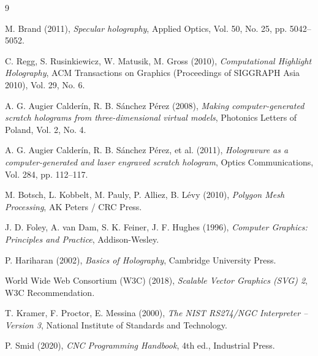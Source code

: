 \documentclass[a4paper,11pt,titlepage,twoside]{book}
\newcommand{\1}{\mathbf{1}}
\numberwithin{equation}{chapter}
\theoremstyle{plain}
\theoremstyle{definition}
\begin{document}
	\clearpage
	\renewcommand{\bibname}{Bibliografia}
	\begin{thebibliography}{9}
		
		M. Brand (2011),
		\emph{Specular holography},
		Applied Optics, Vol. 50, No. 25, pp. 5042--5052.
		
		C. Regg, S. Rusinkiewicz, W. Matusik, M. Gross (2010),
		\emph{Computational Highlight Holography},
		ACM Transactions on Graphics (Proceedings of SIGGRAPH Asia 2010), Vol. 29, No. 6.
		
		A. G. Augier Calderín, R. B. Sánchez Pérez (2008),
		\emph{Making computer-generated scratch holograms from three-dimensional virtual models},
		Photonics Letters of Poland, Vol. 2, No. 4.
		
		A. G. Augier Calderín, R. B. Sánchez Pérez, et al. (2011),
		\emph{Hologravure as a computer-generated and laser engraved scratch hologram},
		Optics Communications, Vol. 284, pp. 112--117.
		
		M. Botsch, L. Kobbelt, M. Pauly, P. Alliez, B. Lévy (2010),
		\emph{Polygon Mesh Processing},
		AK Peters / CRC Press.
		
		J. D. Foley, A. van Dam, S. K. Feiner, J. F. Hughes (1996),
		\emph{Computer Graphics: Principles and Practice},
		Addison-Wesley.
		
		P. Hariharan (2002), \emph{Basics of Holography}, Cambridge University Press.
		
		World Wide Web Consortium (W3C) (2018), \emph{Scalable Vector Graphics (SVG) 2}, W3C Recommendation.
		
		T. Kramer, F. Proctor, E. Messina (2000), \emph{The NIST RS274/NGC Interpreter -- Version 3}, National Institute of Standards and Technology.
		
		P. Smid (2020), \emph{CNC Programming Handbook}, 4th ed., Industrial Press.
	\end{thebibliography}
	
	
	
\end{document}
